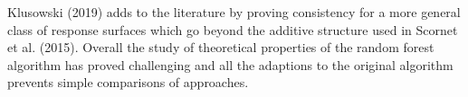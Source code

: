 {Klusowski (2019) adds to the literature by proving consistency for a more general class of response surfaces which go beyond the additive structure used in Scornet et al. (2015). Overall the study of theoretical properties of the random forest algorithm has proved challenging and all the adaptions to the original algorithm prevents simple comparisons of approaches.
}